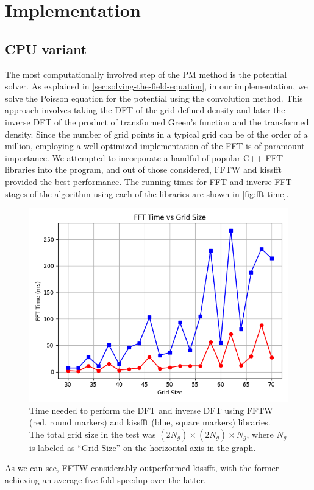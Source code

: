 \section{Implementation}
\subsection{CPU variant}
The most computationally involved step of the PM method is the potential solver.
As explained in \autoref{sec:solving-the-field-equation}, in our implementation, we solve the Poisson equation for the potential using the convolution method.
This approach involves taking the DFT of the grid-defined density and later the inverse DFT of the product of transformed Green's function and the transformed density.
Since the number of grid points in a typical grid can be of the order of a million, employing a well-optimized implementation of the FFT is of paramount importance.
We attempted to incorporate a handful of popular C++ FFT libraries into the program, and out of those considered, FFTW \cite{FFTW05} and kissfft \cite{kissfft} provided the best performance.
The running times for FFT and inverse FFT stages of the algorithm using each of the libraries are shown in \autoref{fig:fft-time}.
\begin{figure}[htp]
    \centering
    \includegraphics[scale=0.5]{chapters/pm-method/img/fft_time.png}
    \caption{Time needed to perform the DFT and inverse DFT using FFTW (red, round markers) and kissfft (blue, square markers) libraries.
        The total grid size in the test was $(2N_g)\times (2N_g) \times N_g$, where $N_g$ is labeled as ``Grid Size'' on the horizontal axis in the graph.}
    \label{fig:fft-time}
\end{figure}
As we can see, FFTW considerably outperformed kissfft, with the former achieving an average five-fold speedup over the latter.


